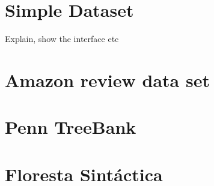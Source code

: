 \section{\label{data:simple} Simple Dataset}

Explain, show the interface etc

\section{\label{data:amazon}Amazon review data set}

\section{\label{data:ptb} Penn TreeBank}


\section{\label{data:floresta} Floresta Sintáctica}

